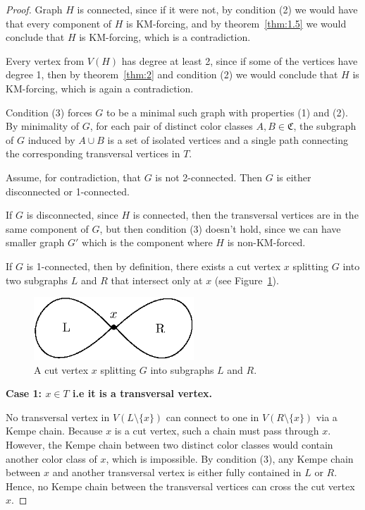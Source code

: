    \begin{proof}

 Graph $H$ is connected, since if it were not, by condition (2) we would have that every component of $H$ is KM-forcing, and by theorem~\ref{thm:1.5}  we would conclude that $H$ is KM-forcing, which is a contradiction. 
   
 Every vertex from $V(H)$ has degree at least 2, since if some of the vertices have 
 degree 1, then by theorem~\ref{thm:2} and condition (2) we would conclude that $H$ is KM-forcing, which is again a contradiction.

 Condition (3) forces $G$ to be a minimal such graph with properties (1) and (2). 
 By minimality of $G$, for each pair of distinct color classes $A, B \in \mathfrak{C}$, 
 the subgraph of $G$ induced by $ A\cup B$ is a set of isolated vertices and a single path connecting the corresponding transversal 
 vertices in $T$.
   
 Assume, for contradiction, that $G$ is not 2-connected. Then $G$ is either disconnected or 1-connected.

 If $G$ is disconnected, since $H$ is connected, then the transversal vertices are in the same component of $G$, but then condition (3)
 doesn't hold, since we can have smaller graph $G'$ which is the component where $H$ is non-KM-forced.

 If $G$ is 1-connected, then by definition, there exists a cut vertex $x$
 splitting $G$ into two subgraphs $L$ and $R$ that intersect only at $x$ (see Figure~\ref{fig:general-case}).

    \begin{figure}[h]
      \centering
      \vspace{0.3cm}
      \includegraphics[width=6cm]{img/general-case.eps}
      \vspace{0.3cm}
      \caption{A cut vertex $x$ splitting $G$ into subgraphs $L$ and $R$.}
      \label{fig:general-case}
  \end{figure}
   
   \textbf{Case 1: $x \in T$ i.e it is a transversal vertex.}
   
 No transversal vertex in $V(L \setminus \{x\})$ can connect to one in $V(R \setminus \{x\})$ via a Kempe chain. Because
$x$ is a cut vertex, such a chain must pass through $x$. However, the Kempe chain between two distinct
 color classes would contain another color class of $x$, which is impossible. By condition (3),  
 any Kempe chain between $x$ and another transversal vertex is either fully contained in $L$ or $R$. Hence, no Kempe chain between the transversal vertices
 can cross the cut vertex $x$. 
   

\end{proof}
